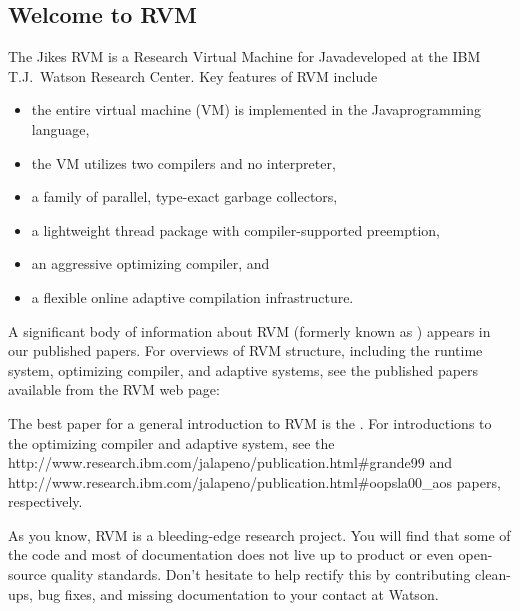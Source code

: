 \subsection {Welcome to RVM}

The Jikes RVM is a Research Virtual Machine for Java\trademark developed at the IBM T.J.\ Watson Research Center.  Key features of RVM include 
\begin{itemize}
\item the entire virtual machine (VM) is implemented in the
  Java\trademark  programming language,
\item the VM utilizes two compilers and no interpreter,
\item a family of parallel, type-exact garbage collectors,
\item a lightweight thread package with compiler-supported preemption,
\item an aggressive optimizing compiler, and 
\item a flexible online adaptive compilation infrastructure.
\end{itemize}

A significant body of information about RVM (formerly known as \jp) appears 
in our published
papers.  For overviews of RVM structure, including the runtime system,
optimizing compiler, and adaptive systems, see the published papers
available from the RVM web page:
\begin{quote}
\end{quote}

The best paper for a general introduction to RVM is 
the 
.  
For introductions to the
optimizing compiler and adaptive system, see the 
{http://www.research.ibm.com/jalapeno/publication.html\#grande99}
 and 
{http://www.research.ibm.com/jalapeno/publication.html\#oopsla00\_aos}  
papers, respectively.

As you know, RVM is a bleeding-edge research project.  You will find that
some of the code and most of documentation does not live up to product or 
even open-source quality standards. Don't hesitate to help rectify this by
contributing clean-ups, bug fixes, and missing documentation to your
contact at Watson.  

